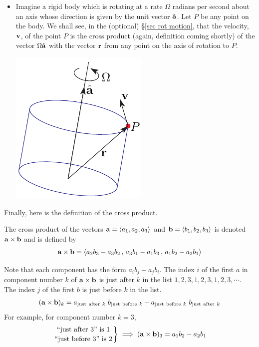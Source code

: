 \begin{itemize}
\item 
Imagine a rigid body which is rotating at a rate $\Omega$ radians per 
second about an axis whose direction is given by the unit vector $\hat{\mathbf{a}}$. 
Let $P$ be any point on the body. We shall see, in the (optional)
\S\ref{sec rot motion}, that the velocity, $\mathbf{v}$, of the point $P$ 
is the cross product 
(again, definition coming shortly) of the vector $\Omega\hat{\mathbf{a}}$ with the vector
$\mathbf{r}$ from any point on the axis of rotation to $P$.
      \begin{nfig} 
      \begin{center}
      \includegraphics{rigidBB}
      \end{center}
      \end{nfig}
\end{itemize}

\noindent
Finally, here is the definition of the cross product.

\begin{defn}\label{def:crossProd}
The cross product of the vectors $\mathbf{a}=\left< a_1,a_2,a_3\right>$ and 
$\mathbf{b}=\left< b_1,b_2,b_3\right>$ is denoted $\mathbf{a}\times\mathbf{b}$ 
and is defined by
\begin{align*}
\mathbf{a}\times\mathbf{b} = \left< a_2b_3-a_3b_2\,,\, a_3b_1-a_1b_3\,,\, a_1b_2-a_2b_1\right> 
\end{align*}
\end{defn}

Note that each component has the form $a_ib_j-a_jb_i$. The index $i$ of
the first $a$ in component number $k$ of $\mathbf{a}\times\mathbf{b}$
is just after $k$ in the list $1,2,3,1,2,3,1,2,3,\cdots$. 
The index $j$ of the first $b$ is just before $k$ in the list. 
\begin{align*}
(\mathbf{a}\times\mathbf{b})_k
=a_{{\rm just\  after\  }k}\ b_{{\rm just\  before\  }k}
-a_{{\rm just\  before\  }k}\ b_{{\rm just\  after\  }k}
\end{align*}
For example, for component number $k=3$,
\begin{align*}
\left.{\text{``just after 3'' is 1}}\atop{\text{``just before 3'' is 2}}\right\}
\implies (\mathbf{a}\times\mathbf{b})_3= a_1b_2-a_2b_1
\end{align*}


